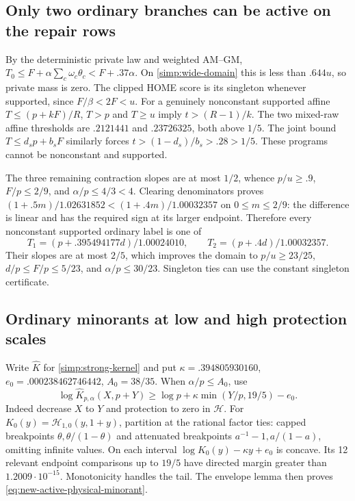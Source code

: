 \subsection{Only two ordinary branches can be active on the repair rows}

By the deterministic private law and weighted AM--GM,
$T_0\le F+\alpha\sum_c\omega_c\theta_c<F+.37\alpha$.
On \eqref{simp:wide-domain} this is less than $.644u$, so private
mass is zero. The clipped HOME score is its singleton whenever supported,
since $F/\beta<2F<u$.
For a genuinely nonconstant supported affine
$T\le(p+kF)/R$, $T>p$ and $T\ge u$ imply $t>(R-1)/k$.
The two mixed-raw affine thresholds are $.2121441$ and $.23726325$,
both above $1/5$. The joint bound $T\le d_sp+b_sF$ similarly forces
$t>(1-d_s)/b_s>.28>1/5$. These programs cannot be nonconstant and supported.

The three remaining contraction slopes are at most $1/2$, whence
$p/u\ge.9$, $F/p\le2/9$, and $\alpha/p\le4/3<4$.
Clearing denominators proves
$(1+.5m)/1.02631852<(1+.4m)/1.00032357$ on $0\le m\le2/9$:
the difference is linear and has the required sign at its larger endpoint.
Therefore every nonconstant supported ordinary label is one of
\begin{equation}\label{simp:weak-affines}
 T_1=(p+.395494177d)/1.00024010,
 \qquad T_2=(p+.4d)/1.00032357.
\end{equation}
Their slopes are at most $2/5$, which improves the domain to
$p/u\ge23/25$, $d/p\le F/p\le5/23$, and $\alpha/p\le30/23$.
Singleton ties can use the constant singleton certificate.

\subsection{Ordinary minorants at low and high protection scales}

Write $\widehat K$ for \eqref{simp:strong-kernel} and put
$\kappa=.394805930160$, $e_0=.000238462746442$, $A_0=38/35$.
When $\alpha/p\le A_0$, use
\begin{equation}\label{eq:new-active-physical-minorant}
 \log\widehat K_{p,\alpha}(X,p+Y)
 \ge\log p+\kappa\min(Y/p,19/5)-e_0.
\end{equation}
Indeed decrease $X$ to $Y$ and protection to zero in $\mathcal H$.
For $K_0(y)=\mathcal H_{1,0}(y,1+y)$, partition at the rational
factor ties: capped breakpoints $\theta,\theta/(1-\theta)$ and
attenuated breakpoints $a^{-1}-1,a/(1-a)$, omitting infinite values.
On each interval $\log K_0(y)-\kappa y+e_0$ is concave.
Its 12 relevant endpoint comparisons up to $19/5$ have directed
margin greater than $1.2009\cdot10^{-15}$. Monotonicity handles the tail.
The envelope lemma then proves \eqref{eq:new-active-physical-minorant}.


